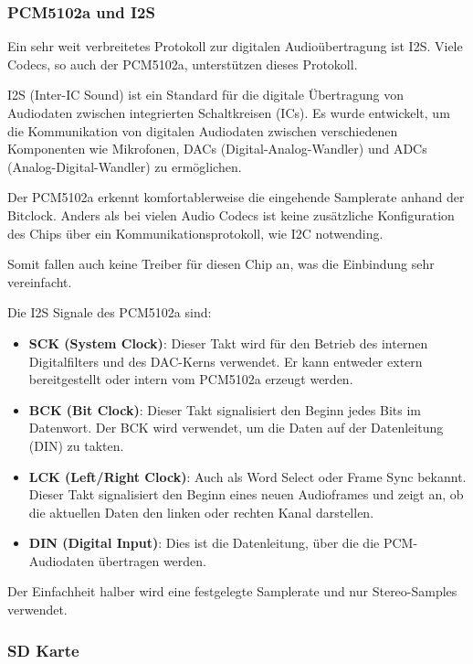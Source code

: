 \subsubsection{PCM5102a und I2S}

Ein sehr weit verbreitetes Protokoll zur digitalen Audioübertragung ist I2S. Viele Codecs, so auch der PCM5102a, unterstützen dieses Protokoll.

I2S (Inter-IC Sound) ist ein Standard für die digitale Übertragung von Audiodaten zwischen integrierten Schaltkreisen (ICs). Es wurde entwickelt, um die Kommunikation von digitalen Audiodaten zwischen verschiedenen Komponenten wie Mikrofonen, DACs (Digital-Analog-Wandler) und ADCs (Analog-Digital-Wandler) zu ermöglichen. \cite{i2s-reference}

Der PCM5102a erkennt komfortablerweise die eingehende Samplerate anhand der Bitclock.
Anders als bei vielen Audio Codecs ist keine zusätzliche Konfiguration des Chips über ein Kommunikationsprotokoll, wie I2C notwending.

Somit fallen auch keine Treiber für diesen Chip an, was die Einbindung sehr vereinfacht.

Die I2S Signale des PCM5102a sind:

\begin{itemize}
	\item \textbf{SCK (System Clock)}: Dieser Takt wird für den Betrieb des internen Digitalfilters und des DAC-Kerns verwendet. Er kann entweder extern bereitgestellt oder intern vom PCM5102a erzeugt werden.
	\item \textbf{BCK (Bit Clock)}: Dieser Takt signalisiert den Beginn jedes Bits im Datenwort. Der BCK wird verwendet, um die Daten auf der Datenleitung (DIN) zu takten.
	\item \textbf{LCK (Left/Right Clock)}: Auch als Word Select oder Frame Sync bekannt. Dieser Takt signalisiert den Beginn eines neuen Audioframes und zeigt an, ob die aktuellen Daten den linken oder rechten Kanal darstellen.
	\item \textbf{DIN (Digital Input)}: Dies ist die Datenleitung, über die die PCM-Audiodaten übertragen werden.
\end{itemize}

Der Einfachheit halber wird eine festgelegte Samplerate und nur Stereo-Samples verwendet.

\subsubsection{SD Karte}

